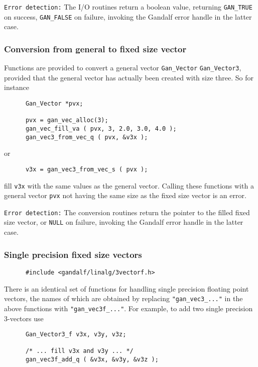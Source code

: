 {\tt Error detection:} The I/O routines return a boolean value, returning
{\tt GAN\_TRUE} on success, {\tt GAN\_FALSE} on failure, invoking the Gandalf
error handle in the latter case.

\subsubsection{Conversion from general to fixed size vector}
Functions are provided to convert a general vector {\tt Gan\_Vector}
{\tt Gan\_Vector3}, provided that the general vector has actually been
created with size three. So for instance
\begin{verbatim}
      Gan_Vector *pvx;

      pvx = gan_vec_alloc(3);
      gan_vec_fill_va ( pvx, 3, 2.0, 3.0, 4.0 );
      gan_vec3_from_vec_q ( pvx, &v3x );
\end{verbatim}
or
\begin{verbatim}
      v3x = gan_vec3_from_vec_s ( pvx );
\end{verbatim}
fill {\tt v3x} with the same values as the general vector.
Calling these functions with a general vector {\tt pvx} not having
the same size as the fixed size vector is an error.

{\tt Error detection:} The conversion routines return the pointer to the
filled fixed size vector, or {\tt NULL} on failure, invoking the Gandalf
error handle in the latter case.

\subsubsection{Single precision fixed size vectors}
\begin{verbatim}
      #include <gandalf/linalg/3vectorf.h>
\end{verbatim}
There is an identical set of functions for handling single precision
floating point vectors, the names of which are obtained by replacing
{\tt "gan\_vec3\_..."} in the above functions with {\tt "gan\_vec3f\_..."}.
For example, to add two single precision 3-vectors use
\begin{verbatim}
      Gan_Vector3_f v3x, v3y, v3z;

      /* ... fill v3x and v3y ... */
      gan_vec3f_add_q ( &v3x, &v3y, &v3z );
\end{verbatim}

